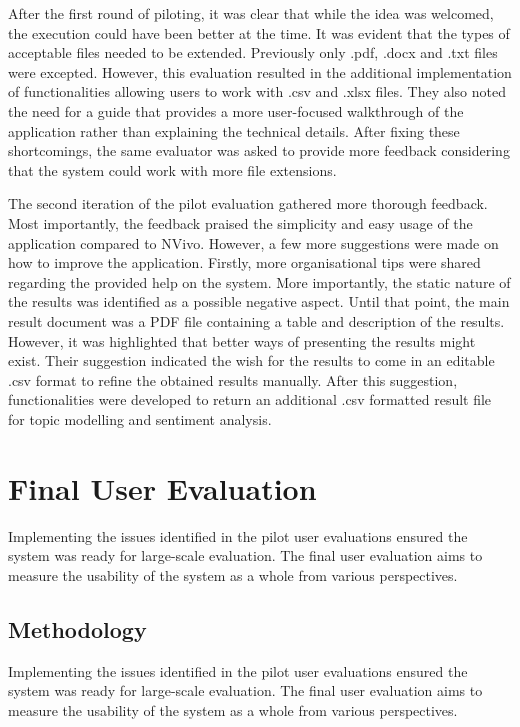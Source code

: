 \documentclass{l4proj}
\begin{document}
After the first round of piloting, it was clear that while the idea was welcomed, the execution could have been better at the time. It was evident that the types of acceptable files needed to be extended. Previously only .pdf, .docx and .txt files were excepted. However, this evaluation resulted in the additional implementation of functionalities allowing users to work with .csv and .xlsx files. They also noted the need for a guide that provides a more user-focused walkthrough of the application rather than explaining the technical details. After fixing these shortcomings, the same evaluator was asked to provide more feedback considering that the system could work with more file extensions.

The second iteration of the pilot evaluation gathered more thorough feedback. Most importantly, the feedback praised the simplicity and easy usage of the application compared to NVivo. However, a few more suggestions were made on how to improve the application. Firstly, more organisational tips were shared regarding the provided help on the system. More importantly, the static nature of the results was identified as a possible negative aspect. Until that point, the main result document was a PDF file containing a table and description of the results. However, it was highlighted that better ways of presenting the results might exist. Their suggestion indicated the wish for the results to come in an editable .csv format to refine the obtained results manually. After this suggestion, functionalities were developed to return an additional .csv formatted result file for topic modelling and sentiment analysis.

\section{Final User Evaluation}
Implementing the issues identified in the pilot user evaluations ensured the system was ready for large-scale evaluation. The final user evaluation aims to measure the usability of the system as a whole from various perspectives.

\subsection{Methodology}
Implementing the issues identified in the pilot user evaluations ensured the system was ready for large-scale evaluation. The final user evaluation aims to measure the usability of the system as a whole from various perspectives.
\end{document}
